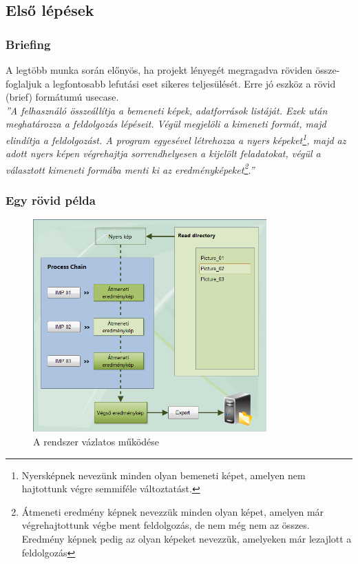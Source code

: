 \documentclass[a4paper,12pt,oneside]{report}
\begin{document}
\subsection{Első lépések}
\subsubsection{Briefing}
A legtöbb munka során előnyös, ha projekt lényegét megragadva röviden össze-foglaljuk a legfontosabb lefutási eset sikeres teljesülését. Erre jó eszköz a rövid (brief\cite{book:usecase_book_brief}) formátumú usecase.
\\\emph{''A felhasználó összeállítja a bemeneti képek, adatforrások listáját. Ezek után meghatározza a feldolgozás lépéseit. Végül megjelöli a kimeneti formát, majd elindítja a feldolgozást. A program egyesével létrehozza a nyers képeket\footnote{Nyersképnek nevezünk minden olyan bemeneti képet, amelyen nem hajtottunk végre semmiféle változtatást.}, majd az adott nyers képen végrehajtja sorrendhelyesen a kijelölt feladatokat, végül a választott kimeneti formába menti ki az eredményképeket\footnote{Átmeneti eredmény képnek nevezzük minden olyan képet, amelyen már végrehajtottunk végbe ment feldolgozás, de nem még nem az összes. Eredmény képnek pedig az olyan képeket nevezzük, amelyeken már lezajlott a feldolgozás}.''}

\subsubsection{Egy rövid példa}
\begin{figure}[h]
	\begin{center}
	  \includegraphics[width=0.8\textwidth]{read-dir-processing_IMP.jpg}
    \end{center}
	  \caption{A rendszer vázlatos működése}
	  \label{fig:bimg_usecase_brief}
\end{figure}
\end{document}
